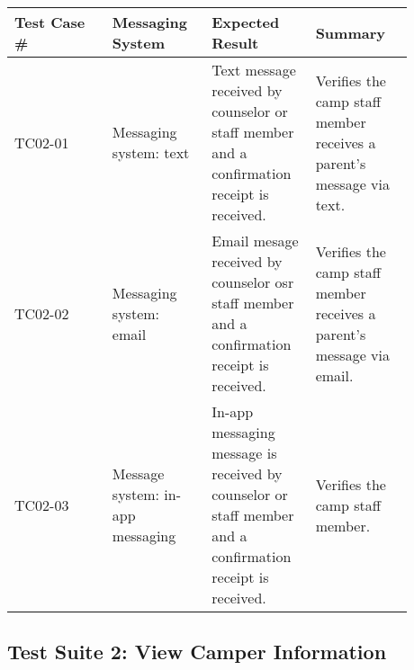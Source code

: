 \documentclass[11pt]{article}
\begin{document}
\begin{center}
\begin{longtable}{|p{0.22\linewidth}|p{0.22\linewidth}|p{0.22\linewidth}|p{0.22\linewidth}|}
	\hline
	Test Case \# & Messaging System & Expected Result & Summary\\\hline
	TC02-01 & Messaging system: text & Text message received by counselor or staff member and a confirmation receipt is received. & Verifies the camp staff member receives a parent's message via text.\vspace*{1em}\\\hline
	TC02-02 & Messaging system: email & Email mesage received by counselor osr staff member and a confirmation receipt is received. & Verifies the camp staff member receives a parent's message via email. \vspace*{1em}\\	\hline
	TC02-03 & Message system: in-app messaging & In-app messaging message is received by counselor or staff member and a confirmation receipt is received. & Verifies the camp staff member.\vspace*{1em}\\\hline
\end{longtable}
\end{center}
\clearpage


\subsection*{Test Suite 2: View Camper Information}
\end{document}

